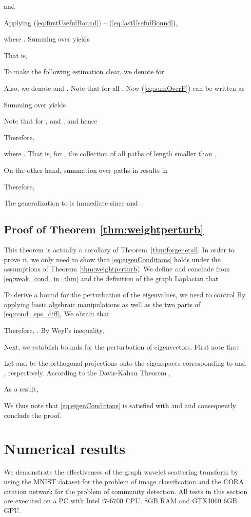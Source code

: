 \documentclass{article}
\begin{document}
and


Applying (\ref{eq:firstUsefulBound}) -- (\ref{eq:lastUsefulBound}), 

where .
Summing over  yields

That is,


To make the following estimation clear,  we denote for 

Also, we denote  and .
Note that  for all . Now (\ref{eq:sumOverP}) can be written as

Summing over  yields

Note that  for , and , and hence

Therefore,
 
where . That is, for , the collection of all paths of length smaller than ,


On the other hand, summation over paths in  results in

Therefore,

The generalization to   is immediate since  and .

\subsection{Proof of Theorem \ref{thm:weightperturb}}
{This theorem is actually a corollary of Theorem~\ref{thm:forgeneral}. In order to prove it, we only need to show that \eqref{eq:eigenConditions} holds under the assumptions of Theorem \ref{thm:weightperturb}. We define  and conclude from \eqref{eq:weak_cond_in_thm} and the definition of the graph Laplacian that  
}

{To derive a bound for the perturbation of the eigenvalues, we need to control   
By applying basic algebraic manipulations as well as the two parts of \eqref{eq:cond_eps_diff}, We obtain that 

Therefore, . By Weyl's inequality,
}

{Next, we establish bounds for the perturbation of eigenvectors. First note that

Let  and  be the orthogonal projections onto the eigenspaces corresponding to  and , respectively. According to the Davis-Kahan Theorem \cite{DavK70, YuWS14}, 

As a result,

We thus note that \eqref{eq:eigenConditions} is satisfied with  and  and consequently conclude the proof.
}


\section{Numerical results}\label{sec:numerical}
We 
demonstrate the effectiveness of the graph wavelet scattering transform
by using the MNIST dataset for the problem of image classification and the CORA citation network for the problem of community detection. All tests in this section are executed on a PC with Intel i7-6700 CPU, 8GB RAM and GTX1060 6GB GPU. 
\end{document}
